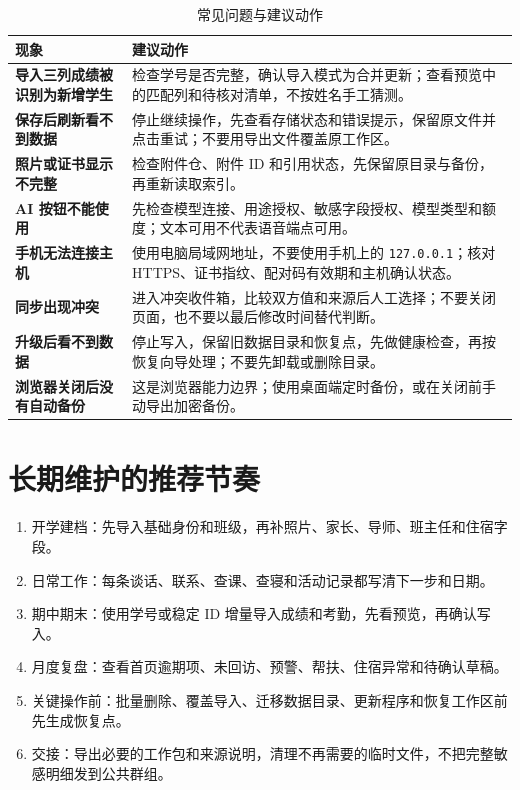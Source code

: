 \documentclass[UTF8,zihao=-4,oneside]{ctexrep}
\newcommand{\code}[1]{\texttt{\small #1}}
\begin{document}
\small
\begin{longtable}{>{\bfseries}p{45mm} p{94mm}}
\caption{常见问题与建议动作}\\
\toprule
现象 & 建议动作 \\
\midrule
导入三列成绩被识别为新增学生 & 检查学号是否完整，确认导入模式为合并更新；查看预览中的匹配列和待核对清单，不按姓名手工猜测。 \\
保存后刷新看不到数据 & 停止继续操作，先查看存储状态和错误提示，保留原文件并点击重试；不要用导出文件覆盖原工作区。 \\
照片或证书显示不完整 & 检查附件仓、附件 ID 和引用状态，先保留原目录与备份，再重新读取索引。 \\
AI 按钮不能使用 & 先检查模型连接、用途授权、敏感字段授权、模型类型和额度；文本可用不代表语音端点可用。 \\
手机无法连接主机 & 使用电脑局域网地址，不要使用手机上的 \code{127.0.0.1}；核对 HTTPS、证书指纹、配对码有效期和主机确认状态。 \\
同步出现冲突 & 进入冲突收件箱，比较双方值和来源后人工选择；不要关闭页面，也不要以最后修改时间替代判断。 \\
升级后看不到数据 & 停止写入，保留旧数据目录和恢复点，先做健康检查，再按恢复向导处理；不要先卸载或删除目录。 \\
浏览器关闭后没有自动备份 & 这是浏览器能力边界；使用桌面端定时备份，或在关闭前手动导出加密备份。 \\
\bottomrule
\end{longtable}
\normalsize

\section{长期维护的推荐节奏}

\begin{enumerate}
  \item 开学建档：先导入基础身份和班级，再补照片、家长、导师、班主任和住宿字段。
  \item 日常工作：每条谈话、联系、查课、查寝和活动记录都写清下一步和日期。
  \item 期中期末：使用学号或稳定 ID 增量导入成绩和考勤，先看预览，再确认写入。
  \item 月度复盘：查看首页逾期项、未回访、预警、帮扶、住宿异常和待确认草稿。
  \item 关键操作前：批量删除、覆盖导入、迁移数据目录、更新程序和恢复工作区前先生成恢复点。
  \item 交接：导出必要的工作包和来源说明，清理不再需要的临时文件，不把完整敏感明细发到公共群组。
\end{enumerate}
\end{document}
